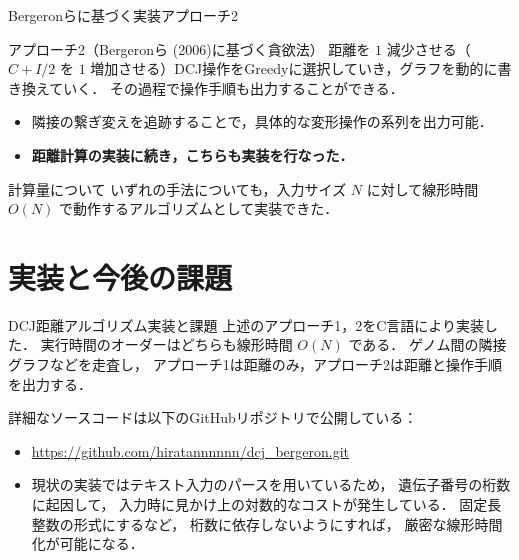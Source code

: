 \documentclass[unicode, 11pt, aspectratio=169]{beamer}
\begin{document}
\begin{frame}{Bergeronらに基づく実装アプローチ2}

    \begin{block}{アプローチ2（Bergeronら (2006)に基づく貪欲法）}
        距離を $1$ 減少させる（$C + I/2$ を $1$ 増加させる）DCJ操作をGreedyに選択していき，グラフを動的に書き換えていく．
        その過程で操作手順も出力することができる．
    \end{block}

    \begin{itemize}
        \item 隣接の繋ぎ変えを追跡することで，具体的な変形操作の系列を出力可能．
        \item \textbf{距離計算の実装に続き，こちらも実装を行なった．}
    \end{itemize}

    \vspace{0.5em}
    \begin{alertblock}{計算量について}
        いずれの手法についても，入力サイズ $N$ に対して線形時間 $O(N)$ で動作するアルゴリズムとして実装できた．
    \end{alertblock}
\end{frame}

\section{実装と今後の課題}
\begin{frame}{DCJ距離アルゴリズム実装と課題}
    上述のアプローチ1，2をC言語により実装した．
    実行時間のオーダーはどちらも線形時間 $O(N)$ である．
    ゲノム間の隣接グラフなどを走査し，
    アプローチ1は距離のみ，アプローチ2は距離と操作手順を出力する．

    詳細なソースコードは以下のGitHubリポジトリで公開している：
    \begin{itemize}
        \item \url{https://github.com/hiratannnnnn/dcj_bergeron.git}
    \end{itemize}

    \vspace{1em}
    \begin{itemize}
        \item 現状の実装ではテキスト入力のパースを用いているため，
        遺伝子番号の桁数に起因して，
        入力時に見かけ上の対数的なコストが発生している．
        固定長整数の形式にするなど，
        桁数に依存しないようにすれば，
        厳密な線形時間化が可能になる．
    \end{itemize}
\end{frame}
\end{document}
